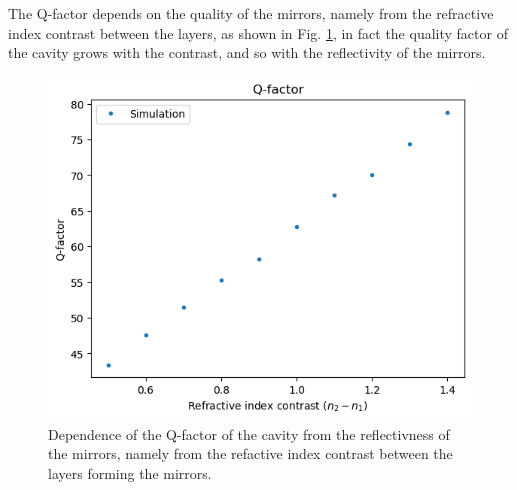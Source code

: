 The Q-factor depends on the quality of the mirrors, namely from the refractive index contrast between the layers, as shown in Fig. \ref{fig:bragg_cavity_qfactor_vs_index}, in fact the quality factor of the cavity grows with the contrast, and so with the reflectivity of the mirrors.

\begin{figure}[H]
    \centering
    \includegraphics[width=0.6\linewidth]{Figures/bragg_cavity_qfactor_vs_index.png}
    \caption{Dependence of the Q-factor of the cavity from the reflectivness of the mirrors, namely from the refactive index contrast between the layers forming the mirrors.}
    \label{fig:bragg_cavity_qfactor_vs_index}
\end{figure}